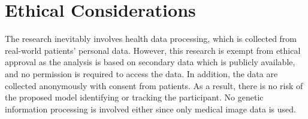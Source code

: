 \documentclass[12pt,twoside]{report}
\begin{document}






\chapter{Ethical Considerations}
The research inevitably involves health data processing, which is collected from real-world patients' personal data. However, this research is exempt from ethical approval as the analysis is based on secondary data which is publicly available, and no permission is required to access the data. In addition, the data are collected anonymously with consent from patients. As a result, there is no risk of the proposed model identifying or tracking the participant. No genetic information processing is involved either since only medical image data is used. \\
\end{document}
